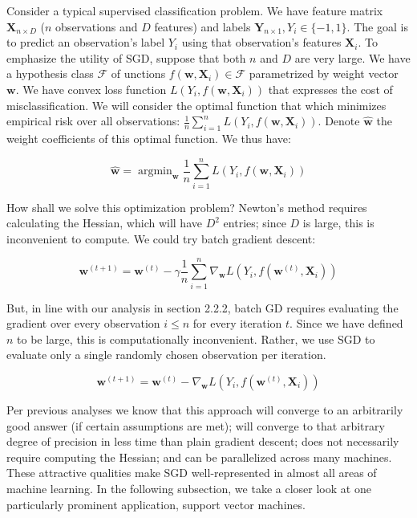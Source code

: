 \documentclass{article}
\DeclareMathOperator*{\argmin}{argmin}
\begin{document}
Consider a typical supervised classification problem. We have
feature matrix $\bm{X}_{n \times D}$ ($n$ observations and $D$
features) and labels $\bm{Y}_{n \times 1}, Y_i \in \{-1, 1\}$. The goal is to
predict an observation's label $Y_i$ using that observation's features
$\bm{X}_i$. To emphasize the utility of SGD, suppose that both $n$ and $D$ are
very large.
We have a hypothesis class $\mathcal{F}$ of unctions $f(\bm{w}, \bm{X}_i) \in \mathcal{F}$ parametrized by weight
vector $\bm{w}$. We have convex loss function $L(Y_i, f(\bm{w}, \bm{X}_i))$ that
expresses the cost of misclassification. 
We will consider the optimal function
that which minimizes empirical risk over all observations: $\frac{1}{n}
\sum_{i=1}^n L(Y_i, f(\bm{w}, \bm{X}_i))$.
Denote $\hat{\bm{w}}$ the weight coefficients of this optimal function. We thus
have:

\begin{equation}
	\hat{\bm{w}} = \argmin_{\bm{w}}\frac{1}{n} \sum_{i=1}^n L(Y_i, f(\bm{w}, \bm{X}_i))
\end{equation}

How shall we solve this optimization problem? Newton's method requires
calculating the Hessian, which will have $D^2$ entries; since $D$ is large,
this is inconvenient to compute. We could try batch gradient descent:

\begin{equation}
	\bm{w}^{(t+1)} = \bm{w}^{(t)} - \gamma \frac{1}{n}\sum_{i=1}^n
	\nabla_{\bm{w}} L(Y_i, f(\bm{w}^{(t)}, \bm{X}_i))
\end{equation}

But, in line with our analysis in section 2.2.2, batch GD requires evaluating
the gradient over every observation $i \leq n$ for every iteration $t$. Since we have defined $n$ to be
large, this is computationally inconvenient. Rather, we use SGD to evaluate only
a single randomly chosen observation per iteration.

\begin{equation}
	\bm{w}^{(t+1)} = \bm{w}^{(t)} - \nabla_{\bm{w}} L(Y_i, f(\bm{w}^{(t)}, \bm{X}_i))
\end{equation}

Per previous analyses we know that this approach will converge to an arbitrarily
good answer (if certain assumptions are met); will converge to that arbitrary
degree of precision in less time than plain gradient descent; does not
necessarily require computing the Hessian; and can be parallelized across many
machines. These attractive qualities make SGD well-represented in almost all areas of
machine learning. In the following subsection, we take a closer look at one
particularly prominent application, support vector machines.
\end{document}

